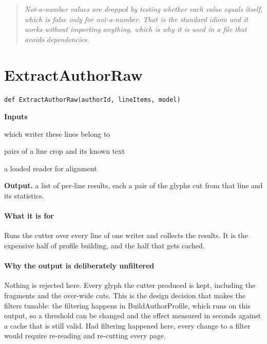\begin{quote}\small\itshape Not-a-number values are dropped by testing whether each value equals itself, which is false only for not-a-number. That is the standard idiom and it works without importing anything, which is why it is used in a file that avoids dependencies.\end{quote}

\section{ExtractAuthorRaw}
\begin{lstlisting}[style=sig]
def ExtractAuthorRaw(authorId, lineItems, model)
\end{lstlisting}

\noindent\textbf{Inputs}
\begin{description}[leftmargin=2.2em,style=nextline,font=\normalfont\ttfamily]\setlength\itemsep{1pt}
  \item[{authorId}] \normalfont which writer these lines belong to
  \item[{lineItems}] \normalfont pairs of a line crop and its known text
  \item[{model}] \normalfont a loaded reader for alignment
\end{description}

\noindent\textbf{Output.} a list of per-line results, each a pair of the glyphs cut from that line and its statistics.


\paragraph{What it is for}
Runs the cutter over every line of one writer and collects the results. It is the expensive half of profile building, and the half that gets cached.


\paragraph{Why the output is deliberately unfiltered}
Nothing is rejected here. Every glyph the cutter produced is kept, including the fragments and the over-wide cuts. This is the design decision that makes the filters tunable: the filtering happens in BuildAuthorProfile, which runs on this output, so a threshold can be changed and the effect measured in seconds against a cache that is still valid. Had filtering happened here, every change to a filter would require re-reading and re-cutting every page.

